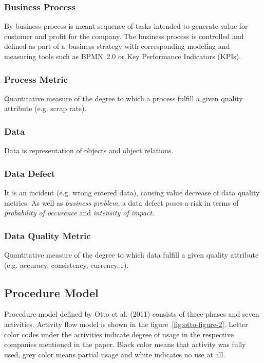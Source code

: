 \subsubsection{Business Process}

By business process is meant sequence of tasks intended to generate value for customer and profit for the company.
The business process is controlled and defined as part of a~business strategy with corresponding modeling and measuring tools such as BPMN~2.0 or Key Performance Indicators (KPIs).

\subsubsection{Process Metric}

Quantitative measure of the degree to which a process fulfill a given quality attribute (e.g. scrap rate).

\subsubsection{Data}

Data is representation of objects and object relations.

\subsubsection{Data Defect}

It is an incident (e.g. wrong entered data), causing value decrease of data quality metrics.
As well as \textit{business problem}, a data defect poses a risk in terms of \textit{probability of occurence} and \textit{intensity of impact}.

\subsubsection{Data Quality Metric}

Quantitative measure of the degree to which data fulfill a given quality attribute (e.g. accuracy, consistency, currency,\ldots).

\subsection{Procedure Model}\label{subsec:procedure-model}

Procedure model defined by Otto et al. (2011) consists of three phases and seven activities.
Activity flow model is shown in the figure~\ref{fig:otto-figure-2}.
Letter color codes under the activities indicate degree of usage in the respective companies mentioned in the paper.
Black color means that activity was fully used, grey color means partial usage and white indicates no use at all.

